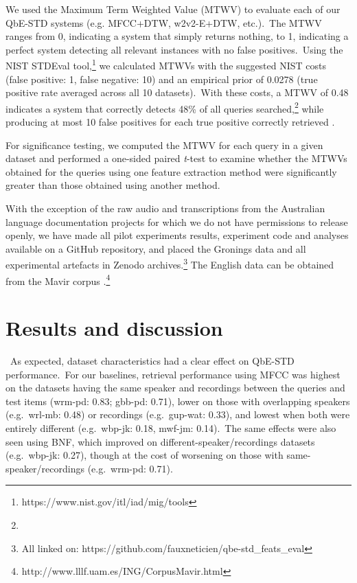 \documentclass[main.tex]{subfiles}
\begin{document}
We used the Maximum Term Weighted Value (MTWV) to evaluate each of our QbE-STD systems (e.g. MFCC+DTW, w2v2-E+DTW, etc.).~The MTWV ranges from 0, indicating a system that simply returns nothing, to 1, indicating a perfect system detecting all relevant instances with no false positives.~Using the NIST STDEval tool,\footnote{https://www.nist.gov/itl/iad/mig/tools} we calculated MTWVs with the suggested NIST costs (false positive: 1, false negative: 10) and an empirical prior of 0.0278 (true positive rate averaged across all 10 datasets).~With these costs, a MTWV of 0.48 indicates a system that correctly detects 48\% of all queries searched,\footnote{} while producing at most 10 false positives for each true positive correctly retrieved \parencite{whiteUsingZeroresourceSpoken2015}.

For significance testing, we computed the MTWV for each query in a given dataset and performed a one-sided paired \emph{t}-test to examine whether the MTWVs obtained for the queries using one feature extraction method were significantly greater than those obtained using another method.

With the exception of the raw audio and transcriptions from the Australian language documentation projects for which we do not have permissions to release openly, we have made all pilot experiments results, experiment code and analyses available on a GitHub repository, and placed the Gronings data and all experimental artefacts in Zenodo archives.\footnote{All linked on: https://github.com/fauxneticien/qbe-std\_feats\_eval\label{ghlink}}
The English data can be obtained from the Mavir corpus \parencite{sandoval2012mavir}.\footnote{http://www.lllf.uam.es/ING/CorpusMavir.html}

\section{Results and discussion}

~As expected, dataset characteristics had a clear effect on QbE-STD performance.~For our baselines, retrieval performance using MFCC was highest on the datasets having the same speaker and recordings between the queries and test items (wrm-pd: 0.83; gbb-pd: 0.71), lower on those with overlapping speakers (e.g.~wrl-mb: 0.48) or recordings (e.g.~gup-wat: 0.33), and lowest when both were entirely different (e.g.~wbp-jk: 0.18, mwf-jm: 0.14).~The same effects were also seen using BNF, which improved on different-speaker/recordings datasets (e.g.~wbp-jk: 0.27), though at the cost of worsening on those with same-speaker/recordings (e.g.~wrm-pd: 0.71).
\end{document}
